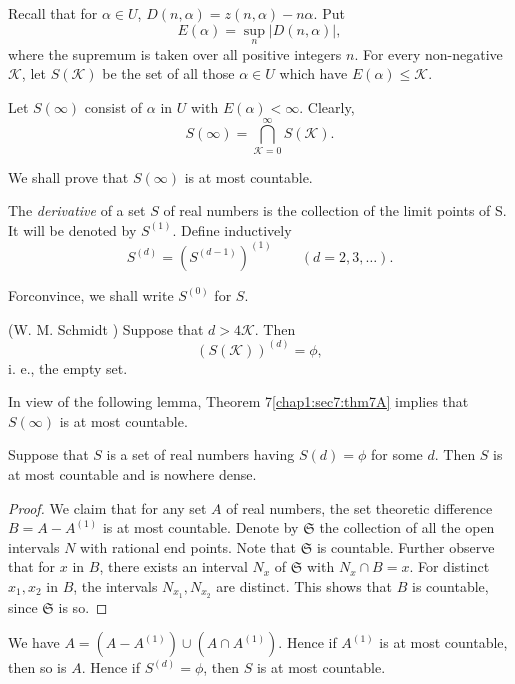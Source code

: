 Recall that for $\alpha \in U$, $D(n, \alpha) = z(n, \alpha)-n\alpha$. Put
$$
E(\alpha) = \sup_{n}|D(n, \alpha)|,
$$
where the supremum is taken over all positive integers $n$. For every non-negative $\mathcal{K}$, let $S(\mathcal{K})$ be the set of all those $\alpha \in U$ which have $E(\alpha) \leq \mathcal{K}$.

Let $S(\infty)$ consist of $\alpha$ in $U$ with $E(\alpha) < \infty$. Clearly,
$$
S(\infty) = \bigcap\limits_{\mathcal{K}=0}^{\infty} S(\mathcal{K}).
$$

We shall prove that $S(\infty)$ is at most countable.

The {\em derivative} of a set $S$ of real numbers is the collection of the limit points of S. It will be denoted by $S^{(1)}$. Define inductively
$$
S^{(d)} = (S^{(d-1)})^{(1)} \qquad(d = 2, 3, \ldots).
$$

For\pageoriginale convince, we shall write $S^{(0)}$ for $S$.

\begin{theorem}\label{chap1:sec7:thm7A}
(W. M. Schmidt \cite{24}) Suppose that $d > 4\mathcal{K}$. Then
$$
(S(\mathcal{K}))^{(d)} = \phi,
$$
i. e., the empty set.
\end{theorem}

In view of the following lemma, Theorem 7\ref{chap1:sec7:thm7A} implies that $S(\infty)$ is at most countable.

\begin{lemma}\label{chap1:sec7:thm7B}
Suppose that $S$ is a set of real numbers having $S(d) = \phi$ for some $d$. Then $S$ is at most countable and is nowhere dense.
\end{lemma}

\begin{proof} 
We claim that for any set $A$ of real numbers, the set theoretic difference $B = A - A^{(1)}$ is at most countable. Denote by $\mathfrak{S}$ the collection of all the open intervals $N$ with rational end points. Note that $\mathfrak{S}$ is countable. Further observe that for $x$ in $B$, there exists an interval $N_{x}$ of $\mathfrak{S}$ with $N_{x} \cap B = x$. For distinct $x_{1}, x_{2}$ in $B$, the intervals $N_{x_{1}}, N_{x_{2}}$ are distinct. This shows that $B$ is countable, since $\mathfrak{S}$ is so.
\end{proof}

We have $A = (A-A^{(1)}) \cup (A \cap A^{(1)})$. Hence if $A^{(1)}$ is at most countable, then so is $A$. Hence if $S^{(d)} = \phi$, then $S$ is at most countable. 

